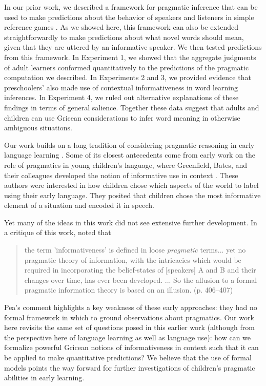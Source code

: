 \documentclass[man,noapacite]{apa2}
\begin{document}
In our prior work, we described a framework for pragmatic inference that can be used to make predictions about the behavior of speakers and listeners in simple reference games \cite{frank2012}. As we showed here, this framework can also be extended straightforwardly to make predictions about what novel words should mean, given that they are uttered by an informative speaker.  We then tested predictions from this framework. In Experiment 1, we showed that the aggregate judgments of adult learners conformed quantitatively to the predictions of the pragmatic computation we described. In Experiments 2 and 3, we provided evidence that preschoolers' also made use of contextual informativeness in word learning inferences. In Experiment 4, we ruled out alternative explanations of these findings in terms of general salience. Together these data suggest that adults and children can use Gricean considerations to infer word meaning in otherwise ambiguous situations. 

Our work builds on a long tradition of considering pragmatic reasoning in early language learning \cite{clark2003,bloom2002,tomasello2003}. Some of its closest antecedents come from early work on the role of pragmatics in young children's language, where Greenfield, Bates, and their colleagues developed the notion of informative use in context \cite{bates1976,greenfield1976,greenfield1978}. These authors were interested in how children chose which aspects of the world to label using their early language. They posited that children chose the most informative element of a situation and encoded it in speech. 

Yet many of the ideas in this work did not see extensive further development. In a critique of this work,  noted that

\begin{quote}
the term 'informativeness' is defined in loose \emph{pragmatic} terms... yet no pragmatic theory of information, with the intricacies which would be required in incorporating the belief-states of [speakers] A and B and their changes over time, has ever been developed. ... So the allusion to a formal pragmatic information theory is based on an illusion. (p. 406--407)
\end{quote}

\noindent Pea's comment highlights a key weakness of these early approaches: they had no formal framework in which to ground observations about pragmatics. Our work here revisits the same set of questions posed in this earlier work (although from the perspective here of language learning as well as language use): how can we formalize powerful Gricean notions of informativeness in context such that it can be applied to make quantitative predictions? We believe that the use of formal models points the way forward for further investigations of children's pragmatic abilities in early learning.
\end{document}
